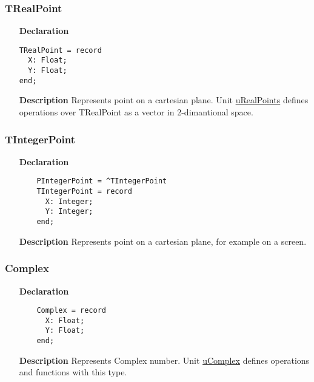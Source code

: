 \documentclass[12pt,a4paper,oneside]{report}
\newcommand{\lmath}[1]{   %
	\marginpar{\vspace{#1} 
		\begin{flushright}
			LMath
	\end{flushright} }
}
\newcommand{\declarationitem}[1]{\textbf{#1}}
\newcommand{\descriptiontitle}[1]{\textbf{#1}}
\begin{document}
\subsubsection{TRealPoint}\label{types:trealpoint}
\lmath{-24pt}
\begin{itemize}
	\item[\declarationitem{Declaration}\hfill]

\begin{verbatim}
TRealPoint = record
  X: Float;
  Y: Float;
end;
\end{verbatim}
\item[\descriptiontitle{Description}]
Represents point on a cartesian plane. Unit \hyperref[uRealPoints]{uRealPoints} defines operations over TRealPoint as a vector in 2-dimantional space.
\end{itemize}
\subsubsection{TIntegerPoint}\label{types:tintegerpoint}
\lmath{-24pt}
\begin{itemize}
	\item[\declarationitem{Declaration}\hfill]
	
	\begin{verbatim}
	PIntegerPoint = ^TIntegerPoint
	TIntegerPoint = record
	  X: Integer;
	  Y: Integer;
	end;
	\end{verbatim}
	\item[\descriptiontitle{Description}]
	Represents point on a cartesian plane, for example on a screen. 
\end{itemize}

\subsubsection{Complex}\label{utypes-complex}
\begin{itemize}
	\item[\declarationitem{Declaration}\hfill]
	\begin{verbatim}
	Complex = record
	  X: Float;
	  Y: Float;
	end;
	\end{verbatim}
	\item[\descriptiontitle{Description}]
Represents Complex number. Unit \hyperref[ucomplex]{uComplex} defines operations and functions with this type.
\end{itemize}
\end{document}
